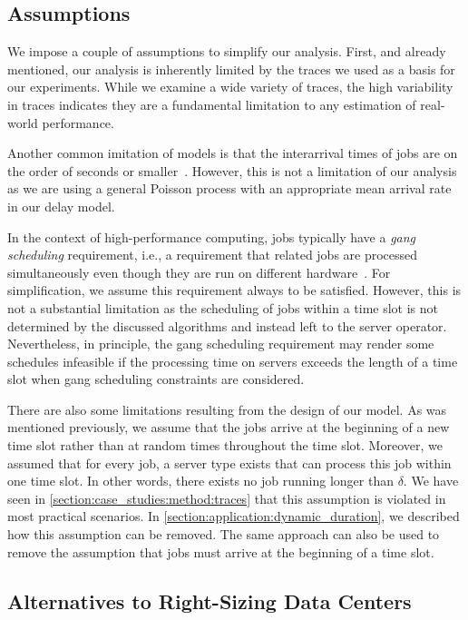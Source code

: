 \subsection{Assumptions}

We impose a couple of assumptions to simplify our analysis. First, and already mentioned, our analysis is inherently limited by the traces we used as a basis for our experiments. While we examine a wide variety of traces, the high variability in traces indicates they are a fundamental limitation to any estimation of real-world performance.

Another common imitation of models is that the interarrival times of jobs are on the order of seconds or smaller~\cite{Amvrosiadis2018}. However, this is not a limitation of our analysis as we are using a general Poisson process with an appropriate mean arrival rate in our delay model.

In the context of high-performance computing, jobs typically have a \emph{gang scheduling} requirement, i.e., a requirement that related jobs are processed simultaneously even though they are run on different hardware~\cite{Amvrosiadis2018}. For simplification, we assume this requirement always to be satisfied. However, this is not a substantial limitation as the scheduling of jobs within a time slot is not determined by the discussed algorithms and instead left to the server operator. Nevertheless, in principle, the gang scheduling requirement may render some schedules infeasible if the processing time on servers exceeds the length of a time slot when gang scheduling constraints are considered.

There are also some limitations resulting from the design of our model. As was mentioned previously, we assume that the jobs arrive at the beginning of a new time slot rather than at random times throughout the time slot. Moreover, we assumed that for every job, a server type exists that can process this job within one time slot. In other words, there exists no job running longer than $\delta$. We have seen in \cref{section:case_studies:method:traces} that this assumption is violated in most practical scenarios. In \cref{section:application:dynamic_duration}, we described how this assumption can be removed. The same approach can also be used to remove the assumption that jobs must arrive at the beginning of a time slot.

\subsection{Alternatives to Right-Sizing Data Centers}\label{section:case_studies:method:alternatives}


